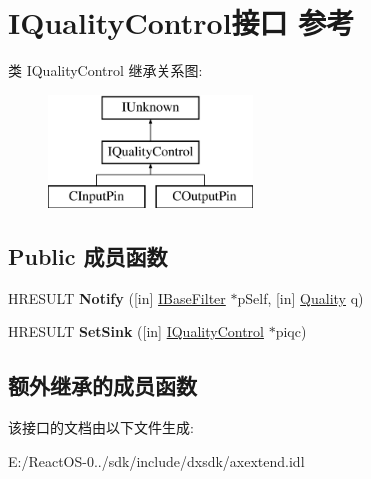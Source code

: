 \hypertarget{interface_i_quality_control}{}\section{I\+Quality\+Control接口 参考}
\label{interface_i_quality_control}
类 I\+Quality\+Control 继承关系图\+:\begin{figure}[H]
\begin{center}
\leavevmode
\includegraphics[height=3.000000cm]{interface_i_quality_control}
\end{center}
\end{figure}
\subsection*{Public 成员函数}
\begin{DoxyCompactItemize}
\item 
\mbox{\label{interface_i_quality_control_a5bc32d972f6d262ad671984ae48d0101}} 
H\+R\+E\+S\+U\+LT {\bfseries Notify} (\mbox{[}in\mbox{]} \hyperlink{interface_i_base_filter}{I\+Base\+Filter} $\ast$p\+Self, \mbox{[}in\mbox{]} \hyperlink{structtag_quality}{Quality} q)
\item 
\mbox{\label{interface_i_quality_control_a6675a19e25511b30c279a96047828c15}} 
H\+R\+E\+S\+U\+LT {\bfseries Set\+Sink} (\mbox{[}in\mbox{]} \hyperlink{interface_i_quality_control}{I\+Quality\+Control} $\ast$piqc)
\end{DoxyCompactItemize}
\subsection*{额外继承的成员函数}


该接口的文档由以下文件生成\+:\begin{DoxyCompactItemize}
\item 
E\+:/\+React\+O\+S-\/0../sdk/include/dxsdk/axextend.\+idl\end{DoxyCompactItemize}

